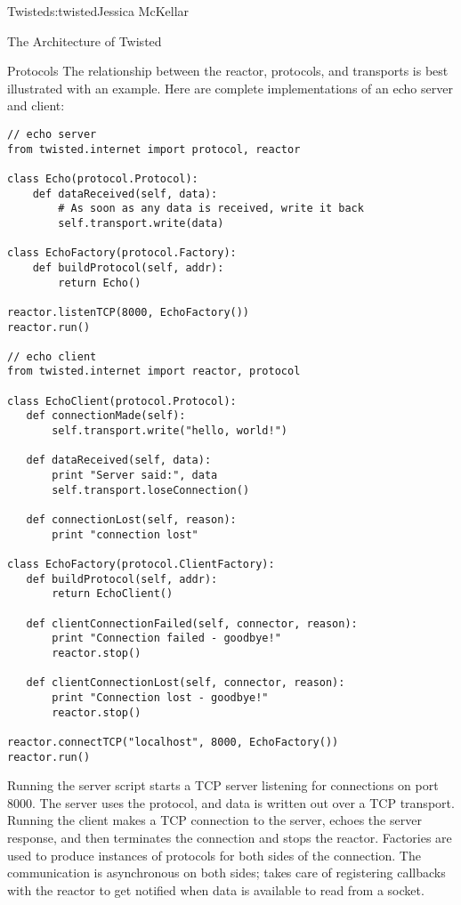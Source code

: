 \begin{aosachapter}{Twisted}{s:twisted}{Jessica McKellar}
\begin{aosasect1}{The Architecture of Twisted}
\begin{aosasect2}{Protocols}
The relationship between the reactor, protocols, and transports is best
illustrated with an example. Here are complete implementations of an echo
server and client:

\begin{verbatim}
// echo server
from twisted.internet import protocol, reactor

class Echo(protocol.Protocol):
    def dataReceived(self, data):
        # As soon as any data is received, write it back
        self.transport.write(data)

class EchoFactory(protocol.Factory):
    def buildProtocol(self, addr):
        return Echo()

reactor.listenTCP(8000, EchoFactory())
reactor.run()

// echo client
from twisted.internet import reactor, protocol

class EchoClient(protocol.Protocol):
   def connectionMade(self):
       self.transport.write("hello, world!")

   def dataReceived(self, data):
       print "Server said:", data
       self.transport.loseConnection()

   def connectionLost(self, reason):
       print "connection lost"

class EchoFactory(protocol.ClientFactory):
   def buildProtocol(self, addr):
       return EchoClient()

   def clientConnectionFailed(self, connector, reason):
       print "Connection failed - goodbye!"
       reactor.stop()

   def clientConnectionLost(self, connector, reason):
       print "Connection lost - goodbye!"
       reactor.stop()

reactor.connectTCP("localhost", 8000, EchoFactory())
reactor.run()
\end{verbatim}

Running the server script starts a TCP server listening for connections on
port 8000. The server uses the  protocol, and data is written
out over a TCP transport. Running the client makes a TCP connection to the
server, echoes the server response, and then terminates the connection and stops
the reactor. Factories are used to produce instances of protocols for both sides
of the connection. The communication is asynchronous on both sides;
 takes care of registering callbacks with the reactor to
get notified when data is available to read from a socket.

\end{aosasect2}


\end{aosasect1}
\end{aosachapter}
